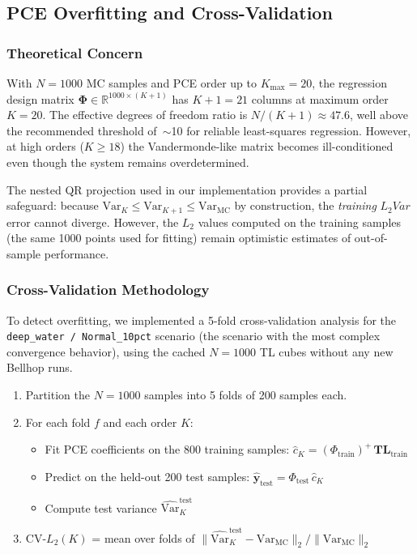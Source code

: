 \documentclass[11pt,a4paper]{article}
\newcommand{\Var}{\mathrm{Var}}
\begin{document}
\subsection{PCE Overfitting and Cross-Validation}
\label{sec:cv}

\subsubsection{Theoretical Concern}

With $N=1000$ MC samples and PCE order up to $K_{\max}=20$, the regression design matrix
$\boldsymbol\Phi \in \mathbb{R}^{1000 \times (K+1)}$ has $K+1 = 21$ columns at maximum
order $K=20$.  The effective degrees of freedom ratio is $N/(K+1) \approx 47.6$, well
above the recommended threshold of~$\sim$10 for reliable least-squares regression.
However, at high orders ($K \geq 18$) the Vandermonde-like matrix becomes ill-conditioned
even though the system remains overdetermined.

The nested QR projection used in our implementation provides a partial safeguard:
because $\Var_K \leq \Var_{K+1} \leq \Var_\text{MC}$ by construction, the \emph{training}
$L_2 Var$ error cannot diverge.  However, the $L_2$ values computed on the training samples
(the same 1000 points used for fitting) remain optimistic estimates of out-of-sample
performance.

\subsubsection{Cross-Validation Methodology}

To detect overfitting, we implemented a 5-fold cross-validation analysis for the
\texttt{deep\_water / Normal\_10pct} scenario (the scenario with the most complex
convergence behavior), using the cached $N=1000$ TL cubes without any new Bellhop runs.

\begin{enumerate}
  \item Partition the $N=1000$ samples into 5 folds of 200 samples each.
  \item For each fold $f$ and each order $K$:
    \begin{itemize}
      \item Fit PCE coefficients on the 800 training samples: $\hat{c}_K = (\Phi_\text{train})^+\,\mathbf{TL}_\text{train}$
      \item Predict on the held-out 200 test samples: $\hat{\mathbf{y}}_\text{test} = \Phi_\text{test}\,\hat{c}_K$
      \item Compute test variance $\widehat{\Var}_K^\text{test}$
    \end{itemize}
  \item CV-$L_2(K)$ = mean over folds of
        $\|\widehat{\Var}_K^\text{test} - \Var_\text{MC}\|_2 / \|\Var_\text{MC}\|_2$
\end{enumerate}
\end{document}
